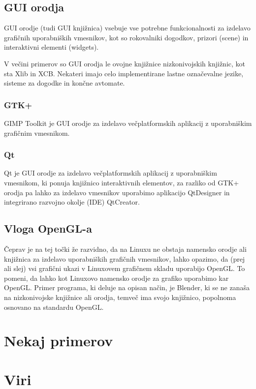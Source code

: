 \documentclass{article}
\begin{document}
\subsection{GUI orodja}
GUI orodje (tudi GUI knjižnica) vsebuje vse potrebne funkcionalnosti za izdelavo grafičnih uporabniških vmesnikov, kot so rokovalniki dogodkov, prizori (scene) in interaktivni elementi (widgets).

V večini primerov so GUI orodja le ovojne knjižnice nizkonivojskih knjižnic, kot sta Xlib in XCB. Nekateri imajo celo implementirane lastne označevalne jezike, sisteme za dogodke in končne avtomate.

\subsubsection{GTK+}
GIMP Toolkit je GUI orodje za izdelavo večplatformskih aplikacij z uporabniškim grafičnim vmesnikom.

\subsubsection{Qt}
Qt je GUI orodje za izdelavo večplatformskih aplikacij z uporabniškim vmesnikom, ki ponuja knjižnico interaktivnih elementov, za razliko od GTK+ orodja pa lahko za izdelavo vmesnikov uporabimo aplikacijo QtDesigner in integrirano razvojno okolje (IDE) QtCreator.

\subsection{Vloga OpenGL-a}
Čeprav je na tej točki že razvidno, da na Linuxu ne obstaja namensko orodje ali knjižnica za izdelavo uporabniških grafičnih vmesnikov, lahko opazimo, da (prej ali slej) vsi grafični ukazi v Linuxovem grafičnem skladu uporabijo OpenGL. To pomeni, da lahko kot Linuxovo namensko orodje za grafiko uporabimo kar OpenGL. Primer programa, ki deluje na opisan način, je Blender, ki se ne zanaša na nizkonivojske knjižnice ali orodja, temveč ima svojo knjižnico, popolnoma osnovano na standardu OpenGL.

\section{Nekaj primerov}

\section{Viri}
\end{document}
